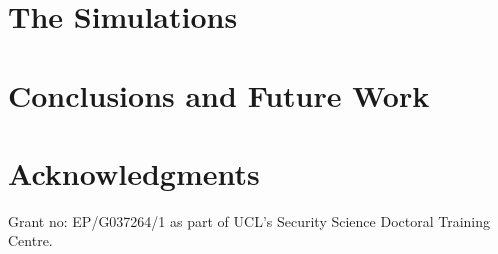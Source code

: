 \documentclass[10pt,peerreviewca]{IEEEtran}
\begin{document}
    

\section{The Simulations}\label{sec:simulations}

    

\section{Conclusions and Future Work}\label{sec:conclusions}

    

\section*{Acknowledgments}

    Grant no: EP/G037264/1 as part of UCL's Security Science Doctoral Training Centre.



\end{document}

